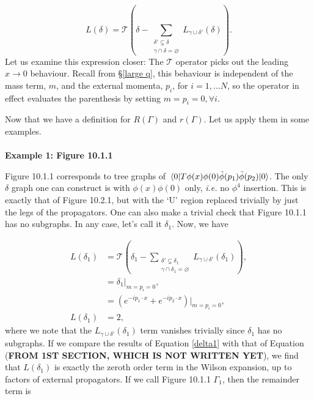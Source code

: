 \documentclass{scrartcl}
\begin{document}
\begin{equation}
    L(\delta) = \mathcal{T} \left( \delta - \sum_{\substack{\delta'\varsubsetneq \delta \\ \gamma\cap\delta = \varnothing }} L_{\gamma\cup\delta'}(\delta) \right).
\end{equation}
Let us examine this expression closer:  The $\mathcal{T}$ operator picks out the leading $x\rightarrow 0$ behaviour. Recall from \S\ref{large q}, this behaviour is independent of the mass term, $m$, and the external momenta, $p_i$, for $i=1,\dots N$, so the operator in effect evaluates the parenthesis by setting $m=p_i=0, \forall i$.

Now that we have a definition for $R(\Gamma)$ and $r(\Gamma)$. Let us apply them in some examples.\\ \\

\noindent\textbf{Example 1: Figure 10.1.1}

Figure 10.1.1 corresponds to tree graphs of $\mel{0}{T\phi(x)\phi(0)\Tilde{\phi}(p_1)\Tilde{\phi}(p_2)}{0}$. The only $\delta$ graph one can construct is with $\phi(x)\phi(0)$ only, \textit{i.e.} no $\phi^4$ insertion. This is exactly that of Figure 10.2.1, but with the `U' region replaced trivially by just the legs of the propagators. One can also make a trivial check that Figure 10.1.1 has no subgraphs. In any case, let's call it $\delta_1$. Now, we have

\begin{equation}
\begin{split}
    L(\delta_1) &= \mathcal{T}\left( \delta_1 - \sum_{\substack{\delta'\varsubsetneq \delta_1 \\ \gamma\cap\delta_1 = \varnothing }} L_{\gamma\cup\delta'}(\delta_1)  \right),\\
    &= \delta_1\vert_{m=p_i=0},\\
    &= (e^{-ip_1\cdot x} + e^{-ip_2\cdot x})\vert_{m=p_i=0},\\
    L(\delta_1) &=2,
\end{split}
\label{delta1}
\end{equation}
where we note that the $L_{\gamma\cup\delta'}(\delta_1)$ term vanishes trivially since $\delta_1$ has no subgraphs.  If we compare the results of Equation \ref{delta1} with that of Equation (\textbf{FROM 1ST SECTION, WHICH IS NOT WRITTEN YET}), we find that $L(\delta_1)$ is exactly the zeroth order term in the Wilson expansion, up to factors of external propagators. If we call Figure 10.1.1 $\Gamma_1$, then the remainder term is 
\end{document}
